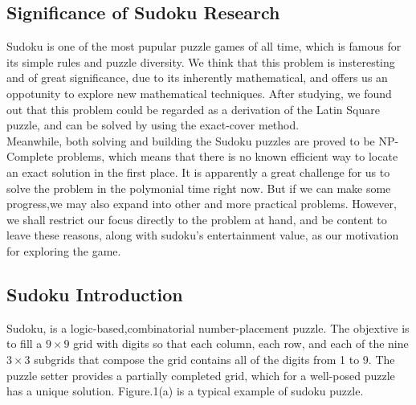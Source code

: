 \documentclass{mcmthesis}
\begin{document}
\subsection{Significance of Sudoku Research}
Sudoku is one of the most pupular puzzle games of all time, which is famous for its simple rules and puzzle diversity. We think that this problem is insteresting and of great significance, due to its inherently mathematical, and offers us an oppotunity to explore new mathematical techniques. After studying, we found out that this problem could be regarded as a derivation of the Latin Square puzzle, and can be solved by using the exact-cover method.\\
\indent Meanwhile, both solving and building the Sudoku puzzles are proved to be NP-Complete problems, which means that there is no known efficient way to locate an exact solution in the first place. It is apparently a great challenge for us to solve the problem in the polymonial time right now. But if we can make some progress,we may also expand into other and more practical problems. However, we shall restrict our focus directly to the problem at hand, and be content to leave these reasons, along with sudoku's entertainment value, as our motivation for exploring the game. 

\subsection{Sudoku Introduction}
Sudoku, is a logic-based,combinatorial number-placement puzzle. The objextive is to fill a $9\times9$ grid with digits so that each column, each row, and each of the nine $3\times3$ subgrids that compose the grid contains all of the digits from 1 to 9. The puzzle setter provides a partially completed grid, which for a well-posed puzzle has a unique solution. Figure.1(a) is a typical example of sudoku puzzle.
\end{document}
